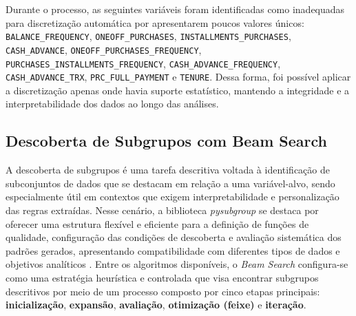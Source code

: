 \documentclass[12pt]{article}
\begin{document}
Durante o processo, as seguintes variáveis foram identificadas como inadequadas para discretização automática por apresentarem poucos valores únicos: \texttt{BALANCE\_FREQUENCY}, \texttt{ONEOFF\_PURCHASES}, \texttt{INSTALLMENTS\_PURCHASES}, \texttt{CASH\_ADVANCE}, \texttt{ONEOFF\_PURCHASES\_FREQUENCY}, \texttt{PURCHASES\_INSTALLMENTS\_FREQUENCY}, \texttt{CASH\_ADVANCE\_FREQUENCY}, \texttt{CASH\_ADVANCE\_TRX}, \texttt{PRC\_FULL\_PAYMENT} e \texttt{TENURE}. Dessa forma, foi possível aplicar a discretização apenas onde havia suporte estatístico, mantendo a integridade e a interpretabilidade dos dados ao longo das análises.

        
\subsection{Descoberta de Subgrupos com Beam Search}

\hspace{1.2cm}A descoberta de subgrupos é uma tarefa descritiva voltada à identificação de subconjuntos de dados que se destacam em relação a uma variável-alvo, sendo especialmente útil em contextos que exigem interpretabilidade e personalização das regras extraídas. Nesse cenário, a biblioteca \textit{pysubgroup} se destaca por oferecer uma estrutura flexível e eficiente para a definição de funções de qualidade, configuração das condições de descoberta e avaliação sistemática dos padrões gerados, apresentando compatibilidade com diferentes tipos de dados e objetivos analíticos \cite{lemmerich:18}. Entre os algoritmos disponíveis, o \textit{Beam Search} configura-se como uma estratégia heurística e controlada que visa encontrar subgrupos descritivos por meio de um processo composto por cinco etapas principais: \textbf{inicialização}, \textbf{expansão}, \textbf{avaliação}, \textbf{otimização (feixe)} e \textbf{iteração}.
\end{document}
